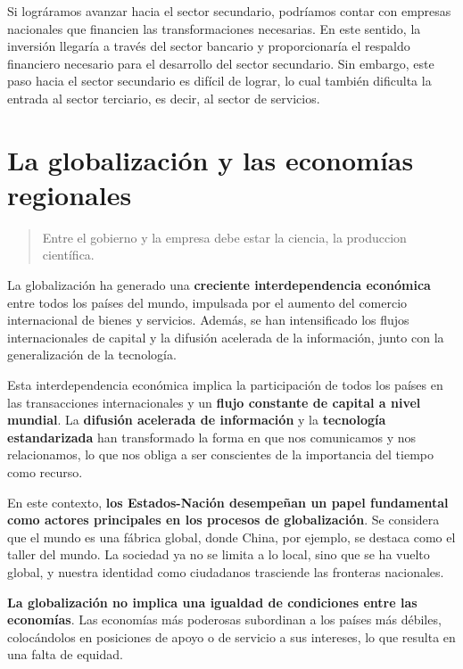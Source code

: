 \documentclass[
  jou,
  floatsintext,
  longtable,
  a4paper,
  nolmodern,
  notxfonts,
  notimes,
  12pt,
  colorlinks=true,linkcolor=blue,citecolor=blue,urlcolor=blue]{apa7}
\begin{document}
Si lográramos avanzar hacia el sector secundario, podríamos contar con
empresas nacionales que financien las transformaciones necesarias. En
este sentido, la inversión llegaría a través del sector bancario y
proporcionaría el respaldo financiero necesario para el desarrollo del
sector secundario. Sin embargo, este paso hacia el sector secundario es
difícil de lograr, lo cual también dificulta la entrada al sector
terciario, es decir, al sector de servicios.

\section{La globalización y las economías
regionales}\label{la-globalizaciuxf3n-y-las-economuxedas-regionales}

\begin{quote}
Entre el gobierno y la empresa debe estar la ciencia, la produccion
científica.
\end{quote}

La globalización ha generado una \textbf{creciente interdependencia
económica} entre todos los países del mundo, impulsada por el aumento
del comercio internacional de bienes y servicios. Además, se han
intensificado los flujos internacionales de capital y la difusión
acelerada de la información, junto con la generalización de la
tecnología.

Esta interdependencia económica implica la participación de todos los
países en las transacciones internacionales y un \textbf{flujo constante
de capital a nivel mundial}. La \textbf{difusión acelerada de
información} y la \textbf{tecnología estandarizada} han transformado la
forma en que nos comunicamos y nos relacionamos, lo que nos obliga a ser
conscientes de la importancia del tiempo como recurso.

En este contexto, \textbf{los Estados-Nación desempeñan un papel
fundamental como actores principales en los procesos de globalización}.
Se considera que el mundo es una fábrica global, donde China, por
ejemplo, se destaca como el taller del mundo. La sociedad ya no se
limita a lo local, sino que se ha vuelto global, y nuestra identidad
como ciudadanos trasciende las fronteras nacionales.

\textbf{La globalización no implica una igualdad de condiciones entre
las economías}. Las economías más poderosas subordinan a los países más
débiles, colocándolos en posiciones de apoyo o de servicio a sus
intereses, lo que resulta en una falta de equidad.
\end{document}
